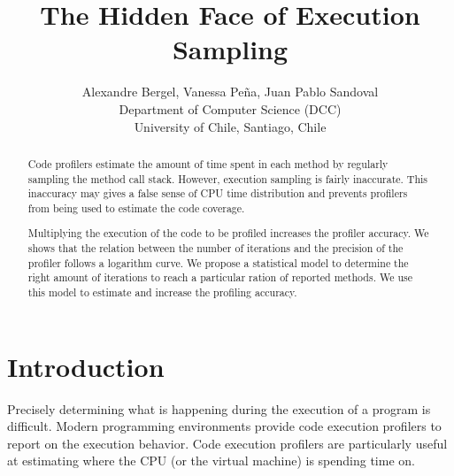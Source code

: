 \documentclass{sig-alternate}
\newcommand{\Title}{The Hidden Face of Execution Sampling}
\newcommand{\TitleShort}{\Title}
\newcommand{\Authors}{Alexandre Bergel, Vanessa Pe\~na, Juan Pablo Sandoval}
\newcommand{\AuthorsShort}{A. Bergel, V. Pe\~na, J.P. Sandoval}
\newcommand{\seclabel}[1]{\label{sec:#1}}
\begin{document}
\title{\Title}

\author{\Authors\\[3mm]
Department of Computer Science (DCC)\\ University of Chile, Santiago, Chile\\[1 ex]
} 

\maketitle


\begin{abstract}
Code profilers estimate the amount of time spent in each method by regularly sampling the method call stack. 
However, execution sampling is fairly inaccurate.
This inaccuracy may gives a false sense of CPU time distribution and prevents profilers from being used to estimate the code coverage.

Multiplying the execution of the code to be profiled increases the profiler accuracy.
We shows that the relation between the number of iterations and the precision of the profiler follows a logarithm curve. 
We propose a statistical model to determine the right amount of iterations to reach a particular ration of reported methods. We use this model to estimate and increase the profiling accuracy.
\end{abstract}

\section{Introduction}\seclabel{introduction}

Precisely determining what is happening during the execution of a program is difficult. Modern programming environments provide code execution profilers to report on the execution behavior. Code execution profilers are particularly useful at estimating where the CPU (or the virtual machine) is spending time on. 
\end{document}
